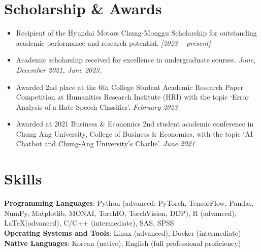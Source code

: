 \documentclass[letterpaper, 11pt]{article}
\newcommand{\resumeItem}[1]{
  \item\small{
    {#1 \vspace{-3pt}}
  }
}
\newcommand{\resumeItemListStart}{\begin{itemize}}
\newcommand{\resumeItemListEnd}{\end{itemize}\vspace{0pt}}
\begin{document}
\section{Scholarship \& Awards }
\vspace{-3pt}
\resumeItemListStart
\vspace{-5pt}
\resumeItem{Recipient of the Hyundai Motors Chung-Monggu Scholarship for outstanding academic performance and research potential. \textit{[2023 -- present]}}
\vspace{-5pt}
\resumeItem{Academic scholarship received for excellence in undergraduate courses. \textit{June, December 2021, June 2023.}}
\vspace{-4pt}
\resumeItem{Awarded 2nd place at the 6th College Student Academic Research Paper Competition at Humanities Research Institute (HRI) with the topic ‘Error Analysis of a Hate Speech Classifier’. \textit{February 2023}}
\vspace{-4pt}
\resumeItem{Awarded at 2021 Business \& Economics 2nd student academic conference in Chung Ang University, College of Business \& Economics, with the topic ‘AI Chatbot and Chung-Ang University’s Charlie'. \textit{June 2021}}
\resumeItemListEnd

\section{Skills}
\vspace{-3pt}
\begin{itemize}[leftmargin=0.15in, label={}]\small{\item{
        \textbf{Programming Languages}{: Python (advanced; PyTorch, TensorFlow, Pandas, NumPy, Matplotlib, MONAI, TorchIO, TorchVision, DDP), R (advanced), \LaTeX (advanced), C/C++ (intermediate), SAS, SPSS} \\
        \textbf{Operating Systems and Tools}{: Linux (advanced), Docker (intermediate)} \\
        \textbf{Native Languages}{: Korean (native), English (full professional proficiency)}
        }}
\end{itemize}
\end{document}
